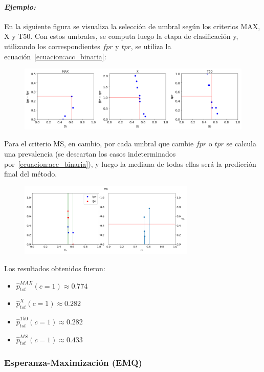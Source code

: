 \paragraph{\it Ejemplo:\/} En la siguiente figura se visualiza la selección de
umbral según los criterios MAX, X y T50. Con estos umbrales, se computa luego la
etapa de clasificación y, utilizando los correspondientes \(fpr\) y \(tpr\), se
utiliza la ecuación~\ref{ecuacion:acc_binaria}:
\begin{figure}[H]
    \includegraphics[width=\textwidth]{../plots_teoria/seleccion_umbrales_max_x_t50.png}
    \caption{}\label{fig:seleccion_umbrales_max_x_t50}
\end{figure}
Para el criterio MS, en cambio, por cada umbral que cambie \(fpr\) o \(tpr\) se
calcula una prevalencia (se descartan los casos indeterminados
por~\ref{ecuacion:acc_binaria}), y luego la mediana de todas ellas será la
predicción final del método.
\begin{figure}[H]
    \centerline{\includegraphics[width=0.75\textwidth]{../plots_teoria/seleccion_umbrales_ms.png}}
    \caption{}\label{fig:seleccion_umbrales_ms}
\end{figure}
Los resultados obtenidos fueron:
\begin{itemize}
    \item \(\hat p^{MAX}_{tst}(c=1) \approx  0.774\)
    \item \(\hat p^{X}_{tst}(c=1) \approx  0.282\)
    \item \(\hat p^{T50}_{tst}(c=1) \approx  0.282\)
    \item \(\hat p^{MS}_{tst}(c=1) \approx  0.433\)
\end{itemize}

\subsubsection{Esperanza-Maximización (EMQ)}\label{estimacion:emq}

